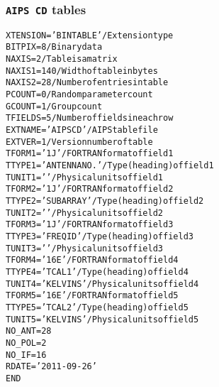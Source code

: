 \documentclass[twoside]{article}
\begin{document}
\subsubsection{{\tt AIPS CD} tables}
\label{Appe:CDtable}
\begin{alltt}
XTENSION= 'BINTABLE'           / Extension type
BITPIX  =                    8 / Binary data
NAXIS   =                    2 / Table is a matrix
NAXIS1  =                  140 / Width of table in bytes
NAXIS2  =                   28 / Number of entries in table
PCOUNT  =                    0 / Random parameter count
GCOUNT  =                    1 / Group count
TFIELDS =                    5 / Number of fields in each row
EXTNAME = 'AIPS CD '           / AIPS table file
EXTVER  =                    1 / Version number of table
TFORM1  = '1J      '           / FORTRAN format of field  1
TTYPE1  = 'ANTENNA NO.     '   / Type (heading) of field  1
TUNIT1  = '        '           / Physical units of field  1
TFORM2  = '1J      '           / FORTRAN format of field  2
TTYPE2  = 'SUBARRAY        '   / Type (heading) of field  2
TUNIT2  = '        '           / Physical units of field  2
TFORM3  = '1J      '           / FORTRAN format of field  3
TTYPE3  = 'FREQ ID         '   / Type (heading) of field  3
TUNIT3  = '        '           / Physical units of field  3
TFORM4  = '16E     '           / FORTRAN format of field  4
TTYPE4  = 'TCAL1           '   / Type (heading) of field  4
TUNIT4  = 'KELVINS '           / Physical units of field  4
TFORM5  = '16E     '           / FORTRAN format of field  5
TTYPE5  = 'TCAL2           '   / Type (heading) of field  5
TUNIT5  = 'KELVINS '           / Physical units of field  5
NO_ANT  =           28
NO_POL  =            2
NO_IF   =           16
RDATE   = '2011-09-26'
END
\end{alltt}
\end{document}
